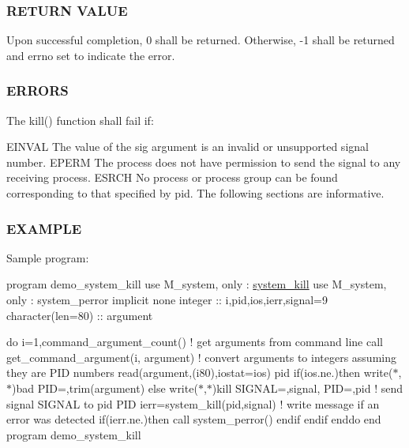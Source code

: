 \subsubsection*{R\+E\+T\+U\+RN V\+A\+L\+UE}

\begin{DoxyVerb}Upon successful completion, 0 shall be returned. Otherwise, -1 shall be
returned and errno set to indicate the error.
\end{DoxyVerb}


\subsubsection*{E\+R\+R\+O\+RS}

The kill() function shall fail if\+:

E\+I\+N\+V\+AL The value of the sig argument is an invalid or unsupported signal number. E\+P\+E\+RM The process does not have permission to send the signal to any receiving process. E\+S\+R\+CH No process or process group can be found corresponding to that specified by pid. The following sections are informative.

\subsubsection*{E\+X\+A\+M\+P\+LE}

Sample program\+:

program demo\+\_\+system\+\_\+kill use M\+\_\+system, only \+: \hyperlink{interfacem__system_1_1system__kill}{system\+\_\+kill} use M\+\_\+system, only \+: system\+\_\+perror implicit none integer \+:\+: i,pid,ios,ierr,signal=9 character(len=80) \+:\+: argument

do i=1,command\+\_\+argument\+\_\+count() ! get arguments from command line call get\+\_\+command\+\_\+argument(i, argument) ! convert arguments to integers assuming they are P\+ID numbers read(argument,\textquotesingle{}(i80)\textquotesingle{},iostat=ios) pid if(ios.\+ne.)then write($\ast$,$\ast$)\textquotesingle{}bad P\+ID=\textquotesingle{},trim(argument) else write($\ast$,$\ast$)\textquotesingle{}kill S\+I\+G\+N\+AL=\textquotesingle{},signal,\textquotesingle{} P\+ID=\textquotesingle{},pid ! send signal S\+I\+G\+N\+AL to pid P\+ID ierr=system\+\_\+kill(pid,signal) ! write message if an error was detected if(ierr.\+ne.)then call system\+\_\+perror(\textquotesingle{}) endif endif enddo end program demo\+\_\+system\+\_\+kill

